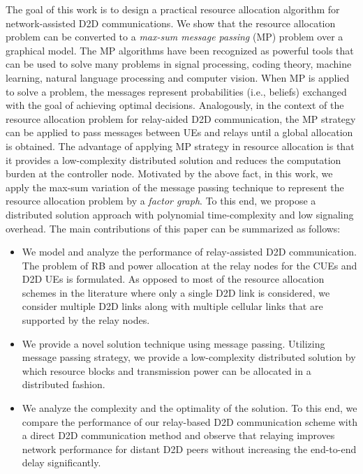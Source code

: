\documentclass[twocolumn,10pt]{IEEEtran}
\begin{document}
The goal of this work is to design a practical resource allocation algorithm for network-assisted D2D communications. We show that the resource allocation problem can be converted to a \textit{max-sum message passing} (MP) problem over a graphical model. The MP algorithms have been recognized as powerful tools that can be used to solve many problems in signal processing, coding theory, machine learning, natural language processing and computer vision. When MP is applied to solve a problem, the messages represent probabilities (i.e., beliefs) exchanged with the goal of achieving optimal decisions. Analogously, in the context of the resource allocation problem  for relay-aided D2D communication, the MP strategy can be applied to pass messages between UEs and relays until a global allocation is obtained. The advantage of applying MP strategy in resource allocation is that it provides a low-complexity distributed solution and reduces the computation burden at the controller node. Motivated by the above fact, in this work, we apply the max-sum variation of the message passing technique to represent the resource allocation problem by a \textit{factor graph}. To this end, we propose a distributed solution approach with polynomial time-complexity and low signaling overhead. The main contributions of this paper can be summarized as follows:

\begin{itemize}

\item We model and analyze the performance of relay-assisted D2D communication. The problem of RB and power allocation at the relay nodes for the CUEs and D2D UEs is formulated. As opposed to most of the resource allocation schemes in the literature where only a single D2D link is considered, we consider multiple D2D links along with
multiple cellular links that are supported by the relay nodes.

\item We provide a novel solution technique using message passing. Utilizing message passing strategy, we provide a low-complexity distributed solution by which resource blocks and transmission power can be allocated in a distributed fashion.

\item We analyze the complexity and the optimality of the solution. To this end, we compare the performance of our relay-based D2D communication scheme with a direct D2D communication method and observe that relaying improves network performance for distant D2D peers without increasing the end-to-end delay significantly.
\end{itemize} 
\end{document}
